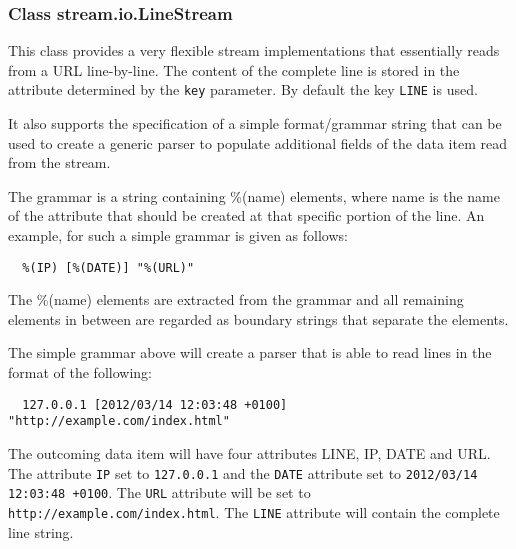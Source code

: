 \subsubsection{\label{api:stream:io:LineStream}Class {\ttfamily stream.io.LineStream}}

This class provides a very flexible stream implementations that
essentially reads from a URL line-by-line. The content of the complete
line is stored in the attribute determined by the \texttt{key}
parameter. By default the key \texttt{LINE} is used.

It also supports the specification of a simple format/grammar string
that can be used to create a generic parser to populate additional
fields of the data item read from the stream.

The grammar is a string containing {\ttfamily \%(name)} elements,
where {\ttfamily name} is the name of the attribute that should be
created at that specific portion of the line. An example, for such
a simple grammar is given as follows:
\begin{verbatim}
  %(IP) [%(DATE)] "%(URL)"
\end{verbatim}
The {\ttfamily \%(name)} elements are extracted from the grammar and
all remaining elements in between are regarded as boundary strings that
separate the elements.

The simple grammar above will create a parser that is able to read
lines in the format of the following:
\begin{verbatim}
  127.0.0.1 [2012/03/14 12:03:48 +0100] "http://example.com/index.html"
\end{verbatim}


The outcoming data item will have four attributes {\ttfamily LINE},
{\ttfamily IP}, {\ttfamily DATE} and {\ttfamily URL}. The attribute
\texttt{IP} set to \texttt{127.0.0.1} and the \texttt{DATE} attribute
set to \texttt{2012/03/14 12:03:48 +0100}. The \texttt{URL} attribute
will be set to \texttt{http://example.com/index.html}. The
\texttt{LINE} attribute will contain the complete line string.

